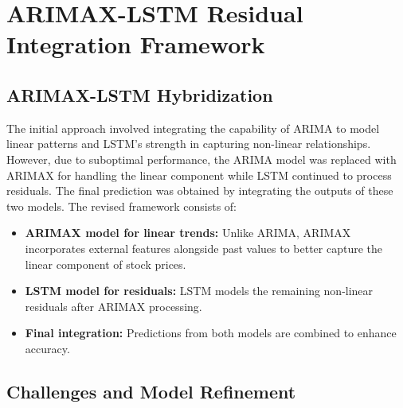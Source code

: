 

\section{ARIMAX-LSTM Residual Integration Framework}
\subsection{ARIMAX-LSTM Hybridization}

The initial approach involved integrating the capability of ARIMA to model linear patterns and LSTM's strength in capturing non-linear relationships. However, due to suboptimal performance, the ARIMA model was replaced with ARIMAX \cite{9998301} for handling the linear component while LSTM continued to process residuals. The final prediction was obtained by integrating the outputs of these two models. The revised framework consists of:

\begin{itemize}
    \item \textbf{ARIMAX model for linear trends:} Unlike ARIMA, ARIMAX incorporates external features alongside past values to better capture the linear component of stock prices.
    \item \textbf{LSTM model for residuals:} LSTM models the remaining non-linear residuals after ARIMAX processing.
    \item \textbf{Final integration:} Predictions from both models are combined to enhance accuracy.
\end{itemize}

\subsection{Challenges and Model Refinement}

